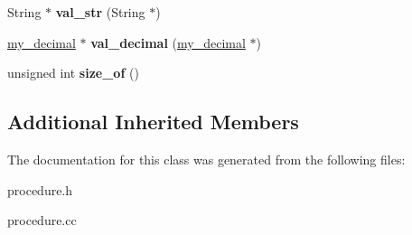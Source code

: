 \begin{DoxyCompactItemize}
\item 
\mbox{\label{classItem__proc__string_a3e654d53ff3bf42810563661152cddb8}} 
String $\ast$ {\bfseries val\+\_\+str} (String $\ast$)
\item 
\mbox{\label{classItem__proc__string_a59b4c6cde41941f47faeebdeb3b06c81}} 
\mbox{\hyperlink{classmy__decimal}{my\+\_\+decimal}} $\ast$ {\bfseries val\+\_\+decimal} (\mbox{\hyperlink{classmy__decimal}{my\+\_\+decimal}} $\ast$)
\item 
\mbox{\label{classItem__proc__string_a68434dd5043fab071224929dfecda21d}} 
unsigned int {\bfseries size\+\_\+of} ()
\end{DoxyCompactItemize}
\subsection*{Additional Inherited Members}


The documentation for this class was generated from the following files\+:\begin{DoxyCompactItemize}
\item 
procedure.\+h\item 
procedure.\+cc\end{DoxyCompactItemize}
